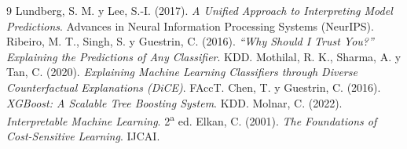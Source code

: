 \documentclass[11pt,a4paper]{article}
\begin{document}
\begin{thebibliography}{9}
 Lundberg, S. M. y Lee, S.-I. (2017). \emph{A Unified Approach to Interpreting
  Model Predictions}. Advances in Neural Information Processing Systems (NeurIPS).
 Ribeiro, M. T., Singh, S. y Guestrin, C. (2016). \emph{``Why Should I Trust You?''
  Explaining the Predictions of Any Classifier}. KDD.
 Mothilal, R. K., Sharma, A. y Tan, C. (2020). \emph{Explaining Machine Learning
  Classifiers through Diverse Counterfactual Explanations (DiCE)}. FAccT.
 Chen, T. y Guestrin, C. (2016). \emph{XGBoost: A Scalable Tree Boosting System}. KDD.
 Molnar, C. (2022). \emph{Interpretable Machine Learning}. 2\textsuperscript{a} ed.
 Elkan, C. (2001). \emph{The Foundations of Cost-Sensitive Learning}. IJCAI.
\end{thebibliography}
\end{document}

